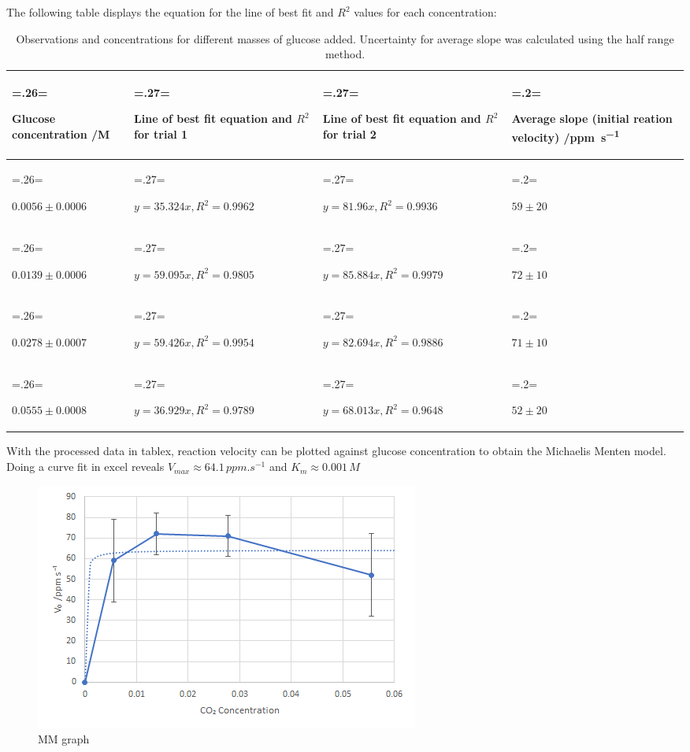\documentclass{article}
\begin{document}
The following table displays the equation for the line of best fit and $R^2$ values for each concentration:
\begin{table}[H]
\centering
\caption{Observations and concentrations for different masses of glucose added. Uncertainty for average slope was calculated using the half range method.}
\label{table:5}
\begin{tabularx}{\textwidth} {
    | >{\hsize=.26\hsize \linewidth=\hsize \raggedright\arraybackslash}X
    | >{\hsize=.27\hsize \linewidth=\hsize \raggedright\arraybackslash}X
    | >{\hsize=.27\hsize \linewidth=\hsize \raggedright\arraybackslash}X
    | >{\hsize=.2\hsize \linewidth=\hsize \raggedright\arraybackslash}X |}
    \hline
    \textbf{Glucose concentration /\si{M}} & \textbf{Line of best fit equation and $R^2$ for trial 1} & \textbf{Line of best fit equation and $R^2$ for trial 2} & \textbf{Average slope (initial reation velocity) /\si{ppm.s^{-1}}} \\
    \hline
    $0.0056 \pm 0.0006$ & $y=35.324x, R^2=0.9962$ & $y=81.96x, R^2=0.9936$ & $59 \pm 20$ \\
    \hline
    $0.0139 \pm 0.0006$ & $y=59.095x, R^2=0.9805$ & $y=85.884x, R^2=0.9979$ & $72 \pm 10$ \\
    \hline
    $0.0278 \pm 0.0007$ & $y=59.426x, R^2=0.9954$ & $y=82.694x, R^2=0.9886$ & $71 \pm 10$ \\
    \hline
    $0.0555 \pm 0.0008$ & $y=36.929x, R^2=0.9789$ & $y=68.013x, R^2=0.9648$ & $52 \pm 20$ \\
    \hline
\end{tabularx}
\end{table}

With the processed data in tablex, reaction velocity can be plotted against glucose concentration to obtain the Michaelis Menten model. Doing a curve fit in excel reveals $V_{max} \approx 64.1\,\si{ppm.s^{-1}}$ and $K_m \approx 0.001\,\si{M}$
\begin{figure}[H]
    \setcounter{figure}{2}
    \centering
    \includegraphics{figures/graph_03.png}
    \vspace*{-12pt}
    \caption{MM graph}
    \label{fig:graph3}
\end{figure}
\end{document}
